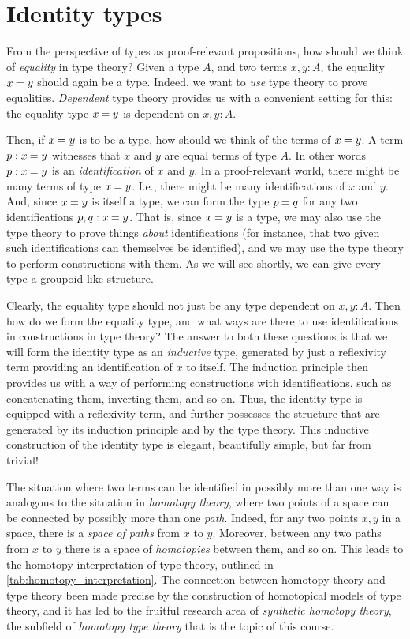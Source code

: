 \chapter{Identity types}\label{chap:identity}
From the perspective of types as proof-relevant propositions, how should we think of \emph{equality} in type theory? Given a type $A$, and two terms $x,y:A$, the equality $\id{x}{y}$ should again be a type. Indeed, we want to \emph{use} type theory to prove equalities. \emph{Dependent} type theory provides us with a convenient setting for this: the equality type $\id{x}{y}$ is dependent on $x,y:A$. 

Then, if $\id{x}{y}$ is to be a type, how should we think of the terms of $\id{x}{y}$. A term $p:\id{x}{y}$ witnesses that $x$ and $y$ are equal terms of type $A$. In other words $p:\id{x}{y}$ is an \emph{identification} of $x$ and $y$. In a proof-relevant world, there might be many terms of type $\id{x}{y}$. I.e., there might be many identifications of $x$ and $y$. And, since $\id{x}{y}$ is itself a type, we can form the type $\id{p}{q}$ for any two identifications $p,q:\id{x}{y}$. That is, since $\id{x}{y}$ is a type, we may also use the type theory to prove things \emph{about} identifications (for instance, that two given such identifications can themselves be identified), and we may use the type theory to perform constructions with them. As we will see shortly, we can give every type a groupoid-like structure.

Clearly, the equality type should not just be any type dependent on $x,y:A$. Then how do we form the equality type, and what ways are there to use identifications in constructions in type theory? The answer to both these questions is that we will form the identity type as an \emph{inductive} type, generated by just a reflexivity term providing an identification of $x$ to itself. The induction principle then provides us with a way of performing constructions with identifications, such as concatenating them, inverting them, and so on. Thus, the identity type is equipped with a reflexivity term, and further possesses the structure that are generated by its induction principle and by the type theory. This inductive construction of the identity type is elegant, beautifully simple, but far from trivial!

The situation where two terms can be identified in possibly more than one way is analogous to the situation in \emph{homotopy theory}, where two points of a space can be connected by possibly more than one \emph{path}. Indeed, for any two points $x,y$ in a space, there is a \emph{space of paths} from $x$ to $y$. Moreover, between any two paths from $x$ to $y$ there is a space of \emph{homotopies} between them, and so on. This leads to the homotopy interpretation of type theory, outlined in \cref{tab:homotopy_interpretation}. The connection between homotopy theory and type theory been made precise by the construction of homotopical models of type theory, and it has led to the fruitful research area of \emph{synthetic homotopy theory}, the subfield of \emph{homotopy type theory} that is the topic of this course.

